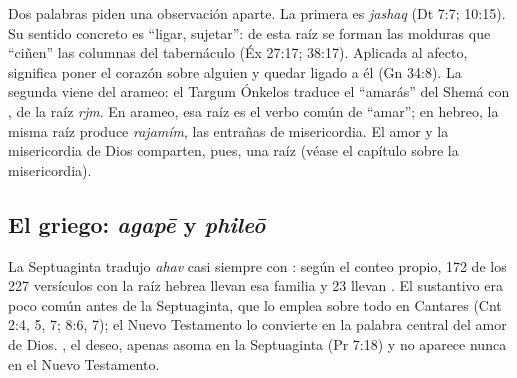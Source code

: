 
Dos palabras piden una observación aparte. La primera es  \emph{jashaq} (Dt 7:7; 10:15). Su sentido concreto es ``ligar, sujetar'': de esta raíz se forman las molduras que ``ciñen'' las columnas del tabernáculo (Éx 27:17; 38:17). Aplicada al afecto, significa poner el corazón sobre alguien y quedar ligado a él (Gn 34:8). La segunda viene del arameo: el Targum Ónkelos traduce el ``amarás'' del Shemá con , de la raíz \emph{rjm}. En arameo, esa raíz es el verbo común de ``amar''; en hebreo, la misma raíz produce \emph{rajamím}, las entrañas de misericordia. El amor y la misericordia de Dios comparten, pues, una raíz (véase el capítulo sobre la misericordia).

\subsection{El griego: \emph{agapē} y \emph{phileō}}
La Septuaginta tradujo \emph{ahav} casi siempre con : según el conteo propio, 172 de los 227 versículos con la raíz hebrea llevan esa familia y 23 llevan . El sustantivo  era poco común antes de la Septuaginta, que lo emplea sobre todo en Cantares (Cnt 2:4, 5, 7; 8:6, 7); el Nuevo Testamento lo convierte en la palabra central del amor de Dios. , el deseo, apenas asoma en la Septuaginta (Pr 7:18) y no aparece nunca en el Nuevo Testamento.


